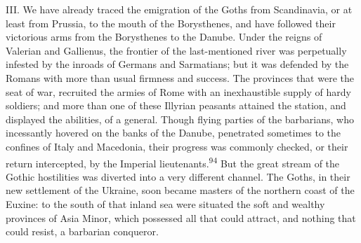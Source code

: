 


III. We have already traced the emigration of the Goths from
Scandinavia, or at least from Prussia, to the mouth of the
Borysthenes, and have followed their victorious arms from the
Borysthenes to the Danube. Under the reigns of Valerian and
Gallienus, the frontier of the last-mentioned river was
perpetually infested by the inroads of Germans and Sarmatians;
but it was defended by the Romans with more than usual firmness
and success. The provinces that were the seat of war, recruited
the armies of Rome with an inexhaustible supply of hardy
soldiers; and more than one of these Illyrian peasants attained
the station, and displayed the abilities, of a general. Though
flying parties of the barbarians, who incessantly hovered on the
banks of the Danube, penetrated sometimes to the confines of
Italy and Macedonia, their progress was commonly checked, or
their return intercepted, by the Imperial lieutenants.\textsuperscript{94} But the
great stream of the Gothic hostilities was diverted into a very
different channel. The Goths, in their new settlement of the
Ukraine, soon became masters of the northern coast of the Euxine:
to the south of that inland sea were situated the soft and
wealthy provinces of Asia Minor, which possessed all that could
attract, and nothing that could resist, a barbarian conqueror.


